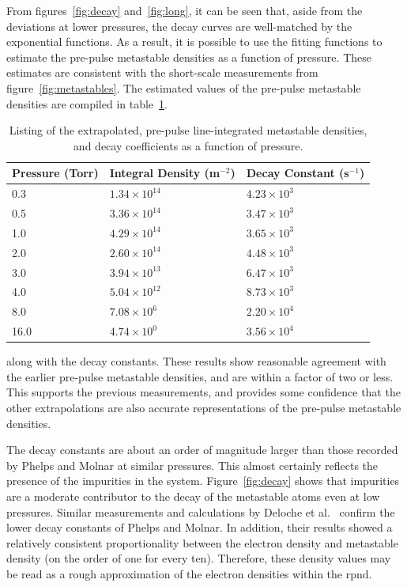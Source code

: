 From figures~\ref{fig:decay} and~\ref{fig:long}, it can be seen that, aside from
the deviations at lower pressures, the decay curves are well-matched by the
exponential functions. As a result, it is possible to use the fitting functions
to estimate the pre-pulse metastable densities as a function of pressure. These
estimates are consistent with the short-scale measurements from
figure~\ref{fig:metastables}. The estimated values of the pre-pulse metastable
densities are compiled in table~\ref{tbl:prepulse}.
\begin{table}
  \centering
  \caption{Listing of the extrapolated, pre-pulse line-integrated metastable 
  densities, and decay coefficients as a function of pressure.}
  \begin{tabular}{lll}
    \toprule
    Pressure (Torr) & Integral Density (m$^{-2}$) & Decay Constant (s$^{-1}$) \\
    \midrule
    0.3  & $1.34\times10^{14}$ & $4.23\times10^3$ \\
    0.5  & $3.36\times10^{14}$ & $3.47\times10^3$ \\
    1.0  & $4.29\times10^{14}$ & $3.65\times10^3$ \\
    2.0  & $2.60\times10^{14}$ & $4.48\times10^3$ \\
    3.0  & $3.94\times10^{13}$ & $6.47\times10^3$ \\
    4.0  & $5.04\times10^{12}$ & $8.73\times10^3$ \\
    8.0  & $7.08\times10^{6}$  & $2.20\times10^4$ \\
    16.0 & $4.74\times10^{0}$  & $3.56\times10^4$ \\
    \bottomrule
  \end{tabular}
  \label{tbl:prepulse}
\end{table}
along with the decay constants. These results show reasonable agreement with the
earlier pre-pulse metastable densities, and are within a factor of two or less.
This supports the previous measurements, and provides some confidence that the
other extrapolations are also accurate representations of the pre-pulse
metastable densities.

The decay constants are about an order of magnitude larger than those recorded
by Phelps and Molnar \cite{Phelps1953} at similar pressures. This almost
certainly reflects the presence of the impurities in the system.
Figure~\ref{fig:decay} shows that impurities are a moderate contributor to the
decay of the metastable atoms even at low pressures. Similar measurements and
calculations by Deloche et al.~\cite{Deloche1976} confirm the lower decay
constants of Phelps and Molnar. In addition, their results showed a relatively
consistent proportionality between the electron density and metastable density
(on the order of one for every ten). Therefore, these density values may be read
as a rough approximation of the electron densities within the \acs{rpnd}.

